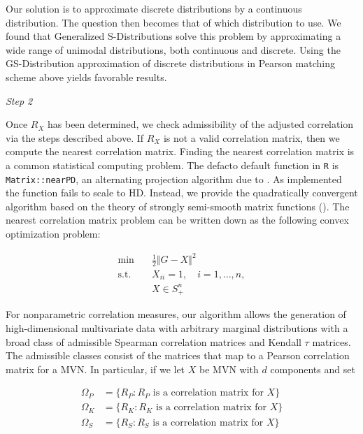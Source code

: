 \documentclass[
]{jss}
\begin{document}
Our solution is to approximate discrete distributions by a continuous distribution. The question then becomes that of which distribution to use. We found that Generalized S-Distributions \citep{muino2006gs} solve this problem by approximating a wide range of unimodal distributions, both continuous and discrete. Using the GS-Distribution approximation of discrete distributions in Pearson matching scheme above yields favorable results.

\emph{Step 2}

Once \(R_X\) has been determined, we check admissibility of the adjusted correlation via the steps described above. If \(R_X\) is not a valid correlation matrix, then we compute the nearest correlation matrix. Finding the nearest correlation matrix is a common statistical computing problem. The defacto default function in \texttt{R} is \texttt{Matrix::nearPD}, an alternating projection algorithm due to \citet{higham2002computing}. As implemented the function fails to scale to HD. Instead, we provide the quadratically convergent algorithm based on the theory of strongly semi-smooth matrix functions (\citet{qi2006quadratically}). The nearest correlation matrix problem can be written down as the following convex optimization problem:

\begin{align*}
    \mathrm{min}\quad & \frac{1}{2} \Vert G - X \Vert^2 \\
    \mathrm{s.t.}\quad & X_{ii} = 1, \quad i = 1, \ldots , n, \\
    & X \in S_{+}^{n}
\end{align*}

For nonparametric correlation measures, our algorithm allows the generation of high-dimensional multivariate data with arbitrary marginal distributions with a broad class of admissible Spearman correlation matrices and Kendall \(\tau\) matrices. The admissible classes consist of the matrices that map to a Pearson correlation matrix for a MVN. In particular, if we let \(X\) be MVN with \(d\) components and set

\begin{align*}
\Omega_P &= \{ R_P : R_P \textrm{ is a correlation matrix for } X \} \\
\Omega_K &= \{ R_K : R_K \textrm{ is a correlation matrix for } X \} \\
\Omega_S &= \{ R_S : R_S \textrm{ is a correlation matrix for } X \} \\
\end{align*}
\end{document}
